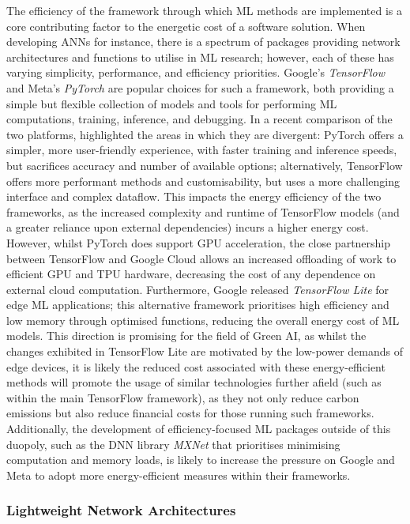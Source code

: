 \documentclass[a4paper, 12pt]{article}
\begin{document}
    The efficiency of the framework through which ML methods are implemented is a core contributing factor to the energetic cost of a software solution. When developing ANNs for instance, there is a spectrum of packages providing network architectures and functions to utilise in ML research; however, each of these has varying simplicity, performance, and efficiency priorities. Google's \emph{TensorFlow} \citep{abadi-2016} and Meta's \emph{PyTorch} \citep{paszke-2019} are popular choices for such a framework, both providing a simple but flexible collection of models and tools for performing ML computations, training, inference, and debugging. In a recent comparison of the two platforms, \citet{chirodea-2021} highlighted the areas in which they are divergent: PyTorch offers a simpler, more user-friendly experience, with faster training and inference speeds, but sacrifices accuracy and number of available options; alternatively, TensorFlow offers more performant methods and customisability, but uses a more challenging interface and complex dataflow. This impacts the energy efficiency of the two frameworks, as the increased complexity and runtime of TensorFlow models (and a greater reliance upon external dependencies) incurs a higher energy cost. However, whilst PyTorch does support GPU acceleration, the close partnership between TensorFlow and Google Cloud allows an increased offloading of work to efficient GPU and TPU hardware, decreasing the cost of any dependence on external cloud computation. Furthermore, Google released \emph{TensorFlow Lite} \citep{david-2020} for edge ML applications; this alternative framework prioritises high efficiency and low memory through optimised functions, reducing the overall energy cost of ML models. This direction is promising for the field of Green AI, as whilst the changes exhibited in TensorFlow Lite are motivated by the low-power demands of edge devices, it is likely the reduced cost associated with these energy-efficient methods will promote the usage of similar technologies further afield (such as within the main TensorFlow framework), as they not only reduce carbon emissions but also reduce financial costs for those running such frameworks. Additionally, the development of efficiency-focused ML packages outside of this duopoly, such as the DNN library \emph{MXNet} \citep{chen-2015} that prioritises minimising computation and memory loads, is likely to increase the pressure on Google and Meta to adopt more energy-efficient measures within their frameworks.

    \subsubsection{Lightweight Network Architectures}
\end{document}
